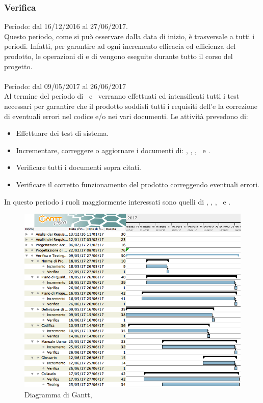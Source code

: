 \subsubsection{Verifica}
Periodo: dal 16/12/2016 al 27/06/2017.\\

Questo periodo, come si può osservare dalla data di inizio, è trasversale a tutti i periodi. Infatti, per garantire ad ogni incremento efficacia ed efficienza del prodotto, le operazioni di  e di  vengono eseguite durante tutto il corso del progetto.\\

\paragraph{\VV}
Periodo: dal 09/05/2017 al 26/06/2017 \\

Al termine del periodo di \PD\ e \COD\ verranno effettuati ed intensificati tutti i test necessari per garantire che il prodotto soddisfi tutti i requisiti dell'\AdR e la correzione di eventuali errori nel codice e/o nei vari documenti.
Le attività prevedono di:
\begin{itemize}
	\item Effettuare dei test di sistema.
	\item Incrementare, correggere o aggiornare i documenti di: \MU, \NdP, \PdP, \PdQ\ e \Gl.
	\item Verificare tutti i documenti sopra citati.
	\item Verificare il corretto funzionamento del prodotto correggendo eventuali errori.
\end{itemize}
In questo periodo i ruoli maggiormente interessati sono quelli di \Ver, \Prog, \Progr, \Am\ e \Pm.

 \begin{figure}[H]
	\centering 
	\includegraphics[scale=0.4]{Immagini/Gantt/VV.png}
	\caption{Diagramma di Gantt, \VV}
\end{figure}